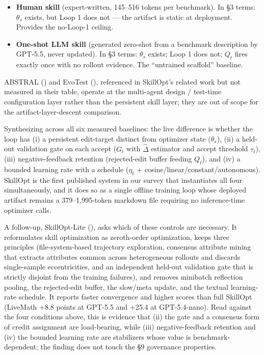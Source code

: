 \documentclass[
]{article}
\begin{document}
\begin{itemize}
  genuine, but there is no \(\eta_t\) bound on per-step folder edits and
  no rejected-edit buffer. SkillOpt beats EvoSkill by \(+14.0\) inside
  Codex and \(+3.2\) inside Claude Code on the GPT-5.5 five-benchmark
  average.
\item
  \textbf{Human skill} (expert-written, 145--516 tokens per benchmark).
  In §3 terms: \(\theta_s\) exists, but Loop 1 does not --- the artifact
  is static at deployment. Provides the no-Loop-1 ceiling.
\item
  \textbf{One-shot LLM skill} (generated zero-shot from a benchmark
  description by GPT-5.5, never updated). In §3 terms: \(\theta_s\)
  exists; Loop 1 does not; \(Q_t\) fires exactly once with no rollout
  evidence. The ``untrained scaffold'' baseline.
\end{itemize}

ABSTRAL () and EvoTest
(), referenced in
SkillOpt's related work but not measured in their table, operate at the
multi-agent design / test-time configuration layer rather than the
persistent skill layer; they are out of scope for the
artifact-layer-descent comparison.

Synthesizing across all six measured baselines: the live difference is
whether the loop has (i) a persistent edit-target distinct from
optimizer state (\(\theta_s\)), (ii) a held-out validation gate on each
accept (\(G_t\) with \(\widehat\Delta\) estimator and accept threshold
\(\tau_t\)), (iii) negative-feedback retention (rejected-edit buffer
feeding \(Q_t\)), and (iv) a bounded learning rate with a schedule
(\(\eta_t\) + cosine/linear/constant/autonomous). SkillOpt is the first
published system in our survey that instantiates all four
simultaneously, and it does so as a single offline training loop whose
deployed artifact remains a 379--1,995-token markdown file requiring no
inference-time optimizer calls.

A follow-up, SkillOpt-Lite (), asks which of these controls are necessary. It reformulates
skill optimization as zeroth-order optimization, keeps three principles
(file-system-based trajectory exploration, consensus attribute mining
that extracts attributes common across heterogeneous rollouts and
discards single-sample eccentricities, and an independent held-out
validation gate that is strictly disjoint from the training failures),
and removes minibatch reflection pooling, the rejected-edit buffer, the
slow/meta update, and the textual learning-rate schedule. It reports
faster convergence and higher scores than full SkillOpt (LiveMath +8.8
points at GPT-5.5 and +25.4 at GPT-5.4-nano). Read against the four
conditions above, this is evidence that (ii) the gate and a consensus
form of credit assignment are load-bearing, while (iii)
negative-feedback retention and (iv) the bounded learning rate are
stabilizers whose value is benchmark-dependent; the finding does not
touch the §9 governance properties.
\end{document}
